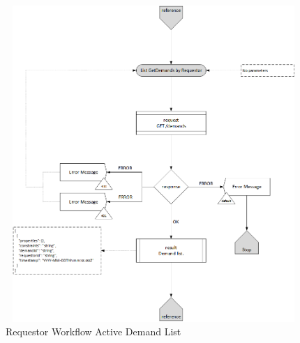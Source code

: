 \begin{enumerate}
\begin{figure}[H]
    \centering
    \includegraphics[width=12cm,height=12cm,angle=0]{./diag/Workflow/Market/List(GetDemands)-R-Workflow.png}
    \caption{Requestor Workflow Active Demand List }
	\label{fig:LD}
\end{figure}

\end{enumerate}

\newpage


